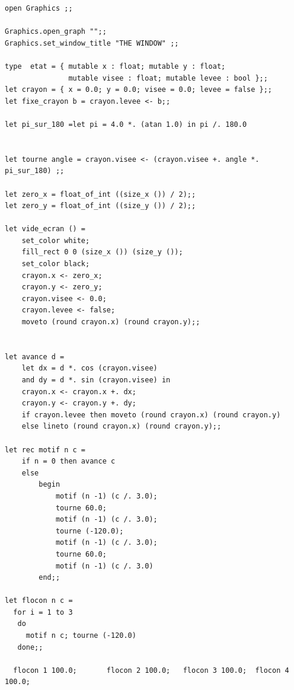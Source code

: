 \documentclass[11pt]{book}
\begin{document}
\begin{Verbatim}
open Graphics ;;

Graphics.open_graph "";;
Graphics.set_window_title "THE WINDOW" ;;

type  etat = { mutable x : float; mutable y : float; 
               mutable visee : float; mutable levee : bool };;
let crayon = { x = 0.0; y = 0.0; visee = 0.0; levee = false };; 
let fixe_crayon b = crayon.levee <- b;;

let pi_sur_180 =let pi = 4.0 *. (atan 1.0) in pi /. 180.0 


let tourne angle = crayon.visee <- (crayon.visee +. angle *. pi_sur_180) ;;

let zero_x = float_of_int ((size_x ()) / 2);;
let zero_y = float_of_int ((size_y ()) / 2);;

let vide_ecran () =
	set_color white;
	fill_rect 0 0 (size_x ()) (size_y ());
	set_color black;
	crayon.x <- zero_x;
	crayon.y <- zero_y;
	crayon.visee <- 0.0;
	crayon.levee <- false;
	moveto (round crayon.x) (round crayon.y);;


let avance d =
	let dx = d *. cos (crayon.visee)
	and dy = d *. sin (crayon.visee) in
	crayon.x <- crayon.x +. dx;
	crayon.y <- crayon.y +. dy;
	if crayon.levee then moveto (round crayon.x) (round crayon.y)
	else lineto (round crayon.x) (round crayon.y);;

let rec motif n c =
	if n = 0 then avance c
	else
		begin
			motif (n -1) (c /. 3.0);
			tourne 60.0;
			motif (n -1) (c /. 3.0);
			tourne (-120.0);
			motif (n -1) (c /. 3.0);
			tourne 60.0;
			motif (n -1) (c /. 3.0)
		end;;

let flocon n c =
  for i = 1 to 3 
   do 
     motif n c; tourne (-120.0)
   done;;

  flocon 1 100.0;		flocon 2 100.0;	  flocon 3 100.0;  flocon 4 100.0;	
\end{Verbatim}
\end{document}
